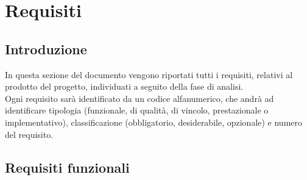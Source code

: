 \chapter{Requisiti}\label{sec:requisiti}
\section{Introduzione}
In questa sezione del documento vengono riportati tutti i requisiti, relativi al prodotto del progetto, individuati a seguito della fase di analisi.\\
Ogni requisito sarà identificato da un codice alfanumerico, che andrà ad identificare tipologia (funzionale, di qualità, di vincolo, prestazionale o implementativo), classificazione (obbligatorio, desiderabile, opzionale) e numero del requisito.

\section{Requisiti funzionali}

